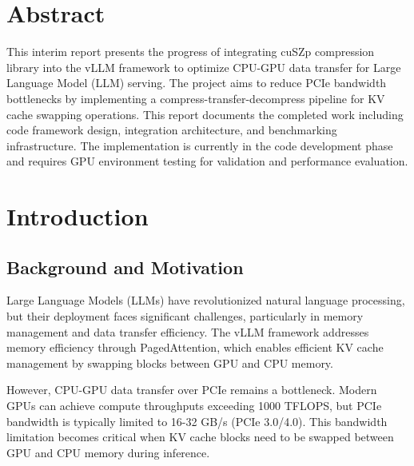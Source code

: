 \documentclass{polyu-comp}
\begin{document}
\printCompCover

\pagestyle{empty}

\chapter*{Abstract}
\thispagestyle{empty}
This interim report presents the progress of integrating cuSZp compression library into the vLLM framework to optimize CPU-GPU data transfer for Large Language Model (LLM) serving. The project aims to reduce PCIe bandwidth bottlenecks by implementing a compress-transfer-decompress pipeline for KV cache swapping operations. This report documents the completed work including code framework design, integration architecture, and benchmarking infrastructure. The implementation is currently in the code development phase and requires GPU environment testing for validation and performance evaluation.

\clearpage
{
  \pagestyle{empty}    %
  
  
  \tableofcontents
}

\clearpage
\pagestyle{plain}       %
\setcounter{page}{1}

\chapter{Introduction}

\section{Background and Motivation}
Large Language Models (LLMs) have revolutionized natural language processing, but their deployment faces significant challenges, particularly in memory management and data transfer efficiency. The vLLM framework \cite{kwon2023efficient} addresses memory efficiency through PagedAttention, which enables efficient KV cache management by swapping blocks between GPU and CPU memory.

However, CPU-GPU data transfer over PCIe remains a bottleneck. Modern GPUs can achieve compute throughputs exceeding 1000 TFLOPS, but PCIe bandwidth is typically limited to 16-32 GB/s (PCIe 3.0/4.0). This bandwidth limitation becomes critical when KV cache blocks need to be swapped between GPU and CPU memory during inference.
\end{document}
